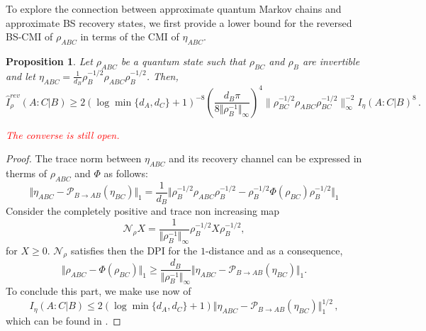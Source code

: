 \documentclass[11pt]{article}
\theoremstyle{newdefinition}
\theoremstyle{newplain}
\newtheorem{proposition}[definition]{Proposition}
\theoremstyle{myplain}
\DeclareMathOperator{\1}{\mathds{1}}
\begin{document}
{
To explore the connection between approximate quantum Markov chains and approximate BS recovery states, we first provide a lower bound for the reversed BS-CMI of $\rho_{ABC}$ in terms of the CMI of $\eta_{ABC}$.
\begin{proposition}\label{prop:relation_Irev_I}
Let $\rho_{ABC}$ be a quantum state such that $\rho_{BC}$ and $\rho_B$ are invertible and let $\eta_{ABC}= \frac{1}{d_B} \rho_B^{-1/2} \rho_{ABC}\rho_B^{-1/2} $. Then,
\begin{equation}
    \widehat{I}^{rev}_{\rho}(A:C | B)\geq  2 (\log\min\{d_A,d_C\}+1)^{-8}\left( \frac{d_B \pi}{8\Vert \rho_B^{-1}\Vert_{\infty}} \right)^4 \|\rho_{BC}^{-1/2}\rho_{ABC}\rho_{BC}^{-1/2} \|_\infty^{-2}I_{\eta}(A:C\vert B)^8 \, .
\end{equation}
\begin{comment}
    \begin{equation}
    \begin{split}
           \widehat{I}^{rev}_{\rho}(A:C | B) &\geq \left( \frac{d_B \pi}{8\Vert \rho_B^{-1}\Vert_{\infty}} \right)^4 \|\rho_{BC}^{-1/2}\rho_{ABC}\rho_{BC}^{-1/2} \|_\infty^{-2}\Vert \eta_{ABC}-\mathcal{P}_{B\rightarrow AB}(\eta_{BC})\Vert_1^4\\
           &\geq  2 (\log\min\{d_A,d_C\}+1)^{-8}\left( \frac{d_B \pi}{8\Vert \rho_B^{-1}\Vert_{\infty}} \right)^4 \|\rho_{BC}^{-1/2}\rho_{ABC}\rho_{BC}^{-1/2} \|_\infty^{-2}I_{\eta}(A:C\vert B)^8 \, .
        \end{split}
    \end{equation}
\end{comment}
\textcolor{red}{The converse is still open.}
\end{proposition}
\begin{proof}
The trace norm between $\eta_{ABC}$ and its recovery channel can be expressed in therms of $\rho_{ABC}$ and $\Phi$ as follows:
    \begin{equation}
            \Vert \eta_{ABC}-\mathcal{P}_{B\rightarrow AB}(\eta_{BC})\Vert_1 
             = \frac{1}{d_B}\Vert \rho_B^{-1/2}\rho_{ABC}\rho_B^{-1/2} -\rho_B^{-1/2}\Phi(\rho_{BC})\rho_B^{-1/2}\Vert_1
    \end{equation}
    Consider the completely positive and trace non increasing map \begin{equation}
    \mathcal{N}_{\rho}X=\frac{1}{\Vert \rho_B^{-1}\Vert_{\infty}}\rho_B^{-1/2}X \rho_B^{-1/2},
    \end{equation}
    for $X\geq 0$. $\mathcal{N}_{\rho}$ satisfies then the DPI for the $1$-distance and as a consequence,
\begin{equation}
        \Vert \rho_{ABC}-\Phi(\rho_{BC})\Vert_1\geq  \frac{d_B}{\Vert \rho_B^{-1}\Vert_{\infty}}\Vert \eta_{ABC}-\mathcal{P}_{B\rightarrow AB}(\eta_{BC})\Vert_1.
    \end{equation}
    To conclude this part, we make use now of 
    \begin{equation}
        I_{\eta}(A:C\vert B)\leq 2 (\log\min\{d_A,d_C\}+1)\Vert \eta_{ABC}-\mathcal{P}_{B\rightarrow AB}(\eta_{BC})\Vert_1^{1/2} \, ,
    \end{equation}
    which can be found in \cite{bluhm2023general}.  
    

\end{proof}}
\end{document}
